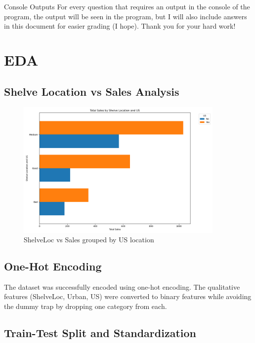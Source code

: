 \documentclass[12pt]{article}
\begin{document}
\maketitlepage

\begin{important}{Console Outputs}
    For every question that requires an output in the console of the program, the output will be seen in the program,
    but I will also include answers in this document for easier grading (I hope). Thank you for your hard work!
\end{important}

\section{EDA}

\subsection{Shelve Location vs Sales Analysis}

\begin{figure}[H]
    \centering
    \includegraphics[width=0.9\textwidth]{images/sales_by_shelveloc_us.png}
    \caption{ShelveLoc vs Sales grouped by US location}
    \label{fig:shelveloc_sales}
\end{figure}

\subsection{One-Hot Encoding}

The dataset was successfully encoded using one-hot encoding. The qualitative features (ShelveLoc, Urban, US) were converted to binary features while avoiding the dummy trap by dropping one category from each.


\subsection{Train-Test Split and Standardization}
\end{document}
